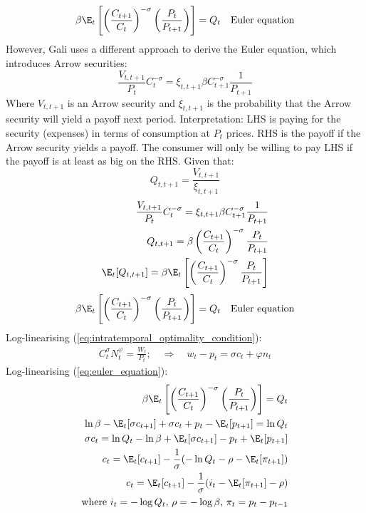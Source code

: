 \begin{align}
    \beta\E_t\left[\left(\frac{C_{t+1}}{C_{t}}\right)^{-\sigma} \left(\frac{P_{t}}{ P_{t+1}}\right)\right]                 = Q_t &  & \text{Euler equation}
\end{align}
However, Gali uses a different approach to derive the Euler equation, which introduces Arrow securities:
\begin{equation}
    \frac{V_{t,t+1}}{P_t}C_{t}^{-\sigma} = \xi_{t,t+1} \beta C_{t+1}^{-\sigma} \frac{1}{P_{t+1}} \label{eq:introduces_arrow_securities}
\end{equation}
Where $V_{t,t+1}$ is an Arrow security and $\xi_{t,t+1}$ is the probability that the Arrow security will yield a payoff next period. Interpretation: LHS is paying for the security (expenses) in terms of consumption at $P_t$ prices. RHS is the payoff if the Arrow security yields a payoff. The consumer will only be willing to pay LHS if the payoff is at least as big on the RHS.
Given that:
\begin{equation}
    Q_{t,t+1} = \frac{V_{t,t+1}}{\xi_{t,t+1}}
\end{equation}
\begin{align}
    \frac{V_{t,t+1}}{P_t}C_{t}^{-\sigma} = \xi_{t,t+1} \beta C_{t+1}^{-\sigma} \frac{1}{P_{t+1}} \\
    Q_{t,t+1} = \beta \left(\frac{C_{t+1}}{C_{t}}\right)^{-\sigma} \frac{P_t}{P_{t+1}}           \\
    \E_t [Q_{t,t+1}] = \beta \E_t\left[\left(\frac{C_{t+1}}{C_{t}}\right)^{-\sigma} \frac{P_t}{P_{t+1}}\right]
\end{align}
\begin{align}
    \beta\E_t\left[\left(\frac{C_{t+1}}{C_{t}}\right)^{-\sigma} \left(\frac{P_{t}}{ P_{t+1}}\right)\right] \label{eq:euler_equation}                = Q_t &  & \text{Euler equation}
\end{align}
Log-linearising (\ref{eq:intratemporal_optimality_condition}):
\begin{align}
    C_t^{\sigma} N_t^{\varphi} =  \frac{W_t}{P_t}; \quad \Rightarrow \quad w_t - p_t = \sigma c_t + \varphi n_t
\end{align}
Log-linearising (\ref{eq:euler_equation}):
\begin{align}
    \beta\E_t\left[\left(\frac{C_{t+1}}{C_{t}}\right)^{-\sigma} \left(\frac{P_{t}}{ P_{t+1}}\right)\right]                = Q_t \nonumber \\
    \ln\beta - \E_t[\sigma c_{t+1}] + \sigma c_t + p_t - \E_t [p_{t+1}] = \ln Q_t                                              \nonumber  \\
    \sigma c_t  = \ln Q_t - \ln \beta + \E_t[\sigma c_{t+1}] - p_t + \E_t [p_{t+1}]                                             \nonumber \\
    c_t =  \E_t[c_{t+1}] - \frac{1}{\sigma}( -\ln Q_t - \rho - \E_t [\pi_{t+1}]   )                                             \nonumber \\
    c_t =  \E_t[c_{t+1}] - \frac{1}{\sigma}( i_t  - \E_t [\pi_{t+1}] - \rho  )                                                            \\
    \text{where $i_t = -\log Q_t$, $\rho = -\log \beta$, $\pi_t = p_t - p_{t-1}$} \nonumber
\end{align}
